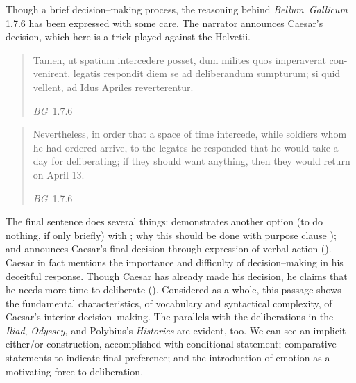 \documentclass[12pt,letterpaper,oneside,final]{memoir}
\begin{document}
Though a brief decision--making process, the reasoning behind \emph{Bellum~Gallicum} 1.7.6 has been expressed with some care. The narrator announces Caesar's decision, which here is a trick played against the Helvetii. \blockquote[\emph{BG}~1.7.6]{\textlatin{Tamen, ut spatium intercedere posset, dum milites quos imperaverat convenirent, legatis respondit diem se ad deliberandum sumpturum; si quid vellent, ad Idus Apriles reverterentur.}}  \blockquote[\emph{BG}~1.7.6]{Nevertheless, in order that a space of time intercede, while soldiers whom he had ordered arrive, to the legates he responded that he would take a day for deliberating; if they should want anything, then they would return on April 13.} The final sentence does several things: demonstrates another option (to do nothing, if only briefly) with ; why this should be done with purpose clause ); and announces Caesar's final decision through expression of verbal action (). Caesar in fact mentions the importance and difficulty of decision--making in his deceitful response. Though Caesar has already made his decision, he claims that he needs more time to deliberate (). Considered as a whole, this passage shows the fundamental characteristics, of vocabulary and syntactical complexity, of Caesar's interior decision--making. The parallels with the deliberations in the \emph{Iliad}, \emph{Odyssey}, and Polybius's \emph{Histories} are evident, too. We can see an implicit either/or construction, accomplished with conditional statement; comparative statements to indicate final preference; and the introduction of emotion as a motivating force to deliberation.
\end{document}
